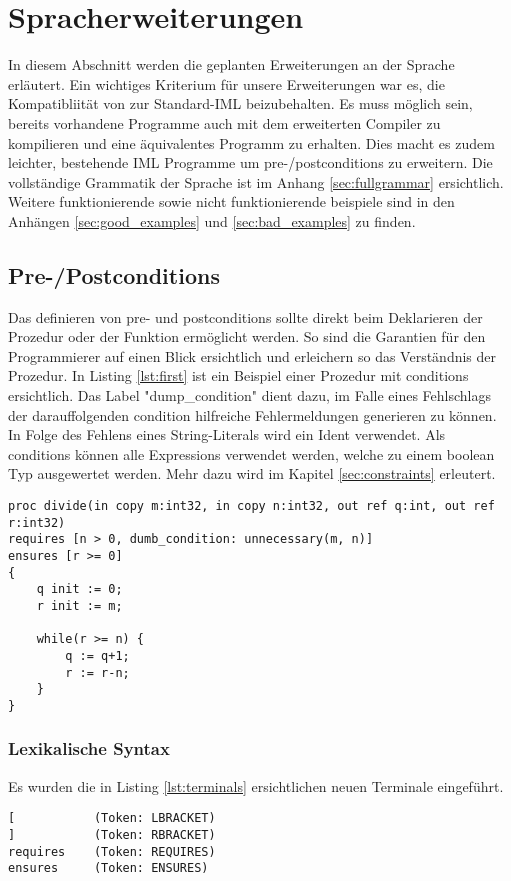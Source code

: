 \section{Spracherweiterungen}
In diesem Abschnitt werden die geplanten Erweiterungen an der Sprache erläutert. 
Ein wichtiges Kriterium für unsere Erweiterungen war es, die Kompatibliität von 
zur Standard-IML beizubehalten. Es muss möglich sein, bereits vorhandene Programme
auch mit dem erweiterten Compiler zu kompilieren und eine äquivalentes Programm zu 
erhalten. Dies macht es zudem leichter, bestehende IML Programme um pre-/postconditions
zu erweitern.
Die vollständige Grammatik der Sprache ist im Anhang \ref{sec:fullgrammar} 
ersichtlich. Weitere funktionierende sowie nicht funktionierende beispiele sind in den Anhängen
\ref{sec:good_examples} und \ref{sec:bad_examples} zu finden.

\subsection{Pre-/Postconditions}
Das definieren von pre- und postconditions sollte direkt beim Deklarieren
der Prozedur oder der Funktion ermöglicht werden. So sind die Garantien
für den Programmierer auf einen Blick ersichtlich und erleichern so 
das Verständnis der Prozedur. In Listing \ref{lst:first} ist ein Beispiel 
einer Prozedur mit conditions ersichtlich. Das Label "dump\_condition" dient dazu, im
Falle eines Fehlschlags der darauffolgenden condition hilfreiche Fehlermeldungen generieren zu können.
In Folge des Fehlens eines String-Literals wird ein Ident verwendet.
Als conditions können alle Expressions verwendet
werden, welche zu einem boolean Typ ausgewertet werden. Mehr dazu wird im 
Kapitel \ref{sec:constraints} erleutert.
\newline
\begin{lstlisting}[caption=Beispiele von pre-/postconditions,label={lst:first}]
proc divide(in copy m:int32, in copy n:int32, out ref q:int, out ref r:int32)
requires [n > 0, dumb_condition: unnecessary(m, n)]
ensures [r >= 0]
{
    q init := 0;
    r init := m;

    while(r >= n) {
        q := q+1;
        r := r-n;
    }
}
\end{lstlisting}

\subsubsection{Lexikalische Syntax}
Es wurden die in Listing \ref{lst:terminals} ersichtlichen neuen Terminale eingeführt.
\begin{lstlisting}[caption=Liste neuer Terminalsymbole,label=lst:terminals]
[           (Token: LBRACKET)
]           (Token: RBRACKET)
requires    (Token: REQUIRES)
ensures     (Token: ENSURES)
\end{lstlisting}

